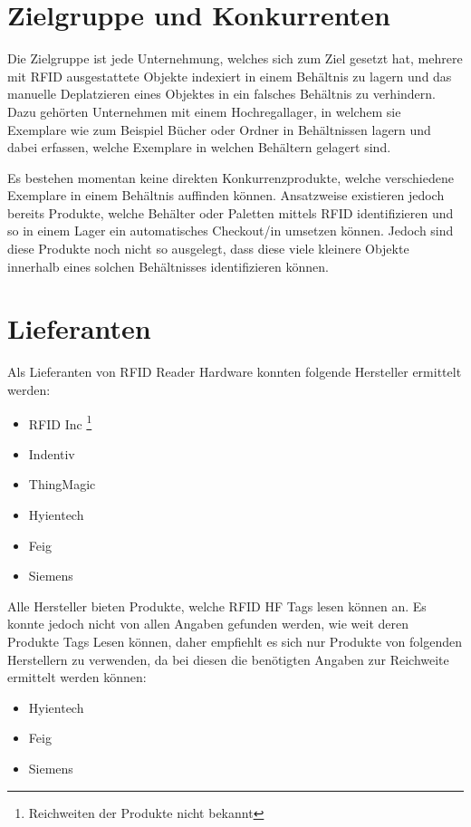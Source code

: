 \section{Zielgruppe und Konkurrenten}
Die Zielgruppe ist jede Unternehmung, welches sich zum Ziel gesetzt hat, mehrere mit RFID ausgestattete Objekte indexiert in einem Behältnis zu lagern und das manuelle Deplatzieren eines Objektes in ein falsches Behältnis zu verhindern.
Dazu gehörten Unternehmen mit einem Hochregallager, in welchem sie Exemplare wie zum Beispiel Bücher oder Ordner in Behältnissen lagern und dabei erfassen, welche Exemplare in welchen Behältern gelagert sind.

Es bestehen momentan keine direkten Konkurrenzprodukte, welche verschiedene Exemplare in einem Behältnis auffinden können. Ansatzweise existieren jedoch bereits Produkte, welche  Behälter oder Paletten mittels RFID identifizieren und so in einem Lager ein automatisches Checkout/in umsetzen können. Jedoch sind diese Produkte noch nicht so ausgelegt, dass diese viele kleinere Objekte innerhalb eines solchen Behältnisses identifizieren können.

\section{Lieferanten}
Als Lieferanten von RFID Reader Hardware konnten folgende Hersteller ermittelt werden:
\renewcommand*{\thefootnote}{\fnsymbol{footnote}}
\begin{itemize}
	\item RFID Inc \footnote[1]{\label{note:range_unknown}Reichweiten der Produkte nicht bekannt}
	\item Indentiv \hyperref[note:range_unknown]{\footnotemark[1]}
	\item ThingMagic \hyperref[note:range_unknown]{\footnotemark[1]}
	\item Hyientech
	\item Feig
	\item Siemens
\end{itemize}
\renewcommand*{\thefootnote}{\arabic{footnote}}

Alle Hersteller bieten Produkte, welche RFID HF Tags lesen können an. Es konnte jedoch nicht von allen Angaben gefunden werden, wie weit deren Produkte Tags Lesen können, daher empfiehlt es sich nur Produkte von folgenden Herstellern zu verwenden, da bei diesen die benötigten Angaben zur Reichweite ermittelt werden können:
\begin{itemize}
	\item Hyientech
	\item Feig
	\item Siemens
\end{itemize}

